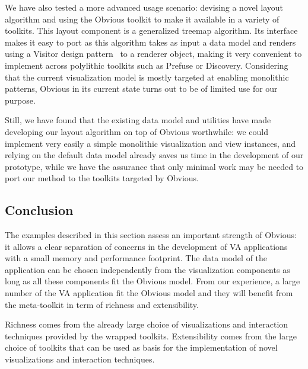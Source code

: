 We have also tested a more advanced usage scenario: devising
a novel layout algorithm and using the Obvious toolkit to make it
available in a variety of toolkits. This layout component is a
generalized treemap algorithm.
Its interface makes it easy to port as this algorithm takes as input a
data model and renders using a Visitor design
pattern~\cite{DesignPatterns} to a renderer object, making it very
convenient to implement across polylithic toolkits such as Prefuse or
Discovery.  Considering that the current visualization model is mostly
targeted at enabling monolithic patterns, Obvious in its current state
turns out to be of limited use for our purpose.

Still, we have found that the existing data model and utilities have
made developing our layout algorithm on top of Obvious worthwhile: we
could implement very easily a simple monolithic visualization and
view instances, and relying on the default data model already saves us
time in the development of our prototype, while we have the assurance
that only minimal work may be needed to port our method to the
toolkits targeted by Obvious.


\subsection{Conclusion}

The examples described in this section assess an important strength of
Obvious: it allows a clear separation of concerns in the development
of VA applications with a small memory and performance footprint.  The
data model of the application can be chosen independently from the
visualization components as long as all these components fit the
Obvious model.  From our experience, a large number of the VA
application fit the Obvious model and they will benefit from the
meta-toolkit in term of richness and extensibility.

Richness comes from the already large choice of visualizations and
interaction techniques provided by the wrapped toolkits.
Extensibility comes from the large choice of toolkits that can be used
as basis for the implementation of novel visualizations and
interaction techniques.
